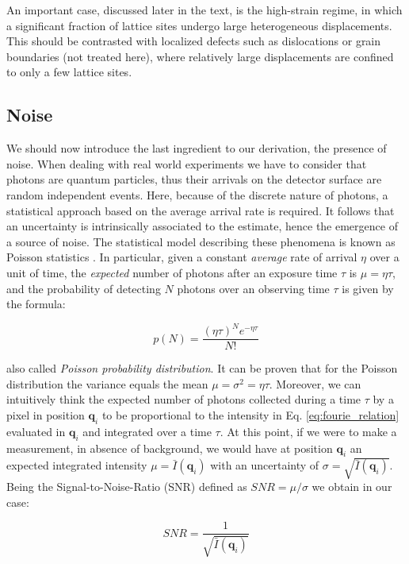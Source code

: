 An important case, discussed later in the text, is the high-strain regime, in which a significant fraction of lattice 
sites undergo large heterogeneous displacements. This should be contrasted with localized defects such as dislocations 
or grain boundaries (not treated here), where relatively large displacements are confined to only a few lattice sites.

\subsection{Noise}

We should now introduce the last ingredient to our derivation, the presence of noise. 
When dealing with real world experiments we have to consider that photons are quantum particles, thus their arrivals on 
the detector surface are random independent events. Here, because of the discrete nature of photons, a statistical approach 
based on the average arrival rate is required. It follows that an uncertainty is intrinsically associated to the estimate, 
hence the emergence of a source of noise. The statistical model describing these phenomena is known as Poisson 
statistics \cite{Poisson}. In particular, given a constant \textit{average} rate of arrival $\eta$ over a unit 
of time, the \textit{expected} number of photons after an exposure time $\tau$ is $\mu = \eta \tau$, and the probability 
of detecting $N$ photons over an observing time $\tau$ is given by the formula: 

\begin{equation}
    p(N) =  \frac{(\eta \tau)^N e^{-\eta \tau}}{N!}
    \label{eq:poisson}
\end{equation}

also called \textit{Poisson probability distribution}. It can be proven that for the Poisson distribution 
the variance equals the mean $\mu = \sigma^2 = \eta \tau $. Moreover, we can intuitively think the expected number of photons 
collected during a time $\tau$ by a pixel in position $\mathbf{q}_i$ to be proportional to the intensity in Eq. \ref{eq:fourie_relation}
evaluated in $\mathbf{q}_i$ and integrated over a time $\tau$.
At this point, if we were to make a measurement, in absence of background, we would have at position $\mathbf{q}_i$ an 
expected integrated intensity $\mu = \bar{I}(\mathbf{q}_i)$ with an uncertainty of $ \sigma = \sqrt{\bar{I}(\mathbf{q}_i)}$. 
Being the Signal-to-Noise-Ratio (SNR) defined as $SNR = \mu / \sigma$ we obtain in our case: 

\begin{equation}
    SNR =  \frac{1}{\sqrt{\bar{I}(\mathbf{q}_i)}} 
    \label{eq:SNR}
\end{equation}


